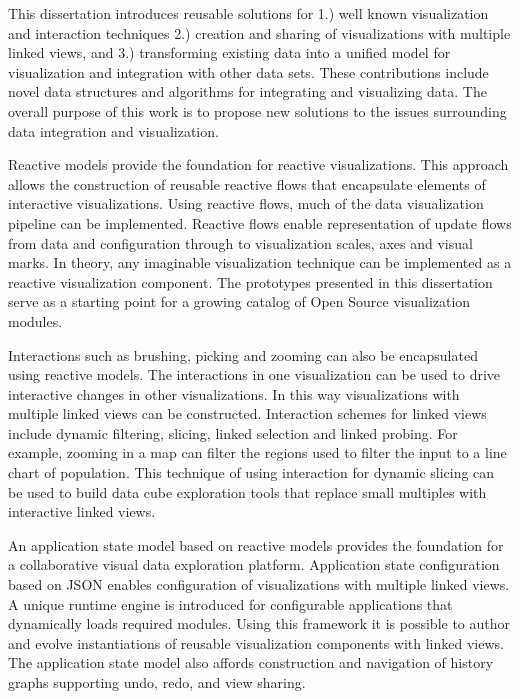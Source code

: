 This dissertation introduces reusable solutions for 1.) well known visualization and interaction techniques 2.) creation and sharing of visualizations with multiple linked views, and 3.) transforming existing data into a unified model for visualization and integration with other data sets. These contributions include novel data structures and algorithms for integrating and visualizing data. The overall purpose of this work is to propose new solutions to the issues surrounding data integration and visualization.

Reactive models provide the foundation for reactive visualizations. This approach allows the construction of reusable reactive flows that encapsulate elements of interactive visualizations. Using reactive flows, much of the data visualization pipeline can be implemented. Reactive flows enable representation of update flows from data and configuration through to visualization scales, axes and visual marks. In theory, any imaginable visualization technique can be implemented as a reactive visualization component. The prototypes presented in this dissertation serve as a starting point for a growing catalog of Open Source visualization modules.

Interactions such as brushing, picking and zooming can also be encapsulated using reactive models. The interactions in one visualization can be used to drive interactive changes in other visualizations. In this way visualizations with multiple linked views can be constructed. Interaction schemes for linked views include dynamic filtering, slicing, linked selection and linked probing. For example, zooming in a map can filter the regions used to filter the input to a line chart of population. This technique of using interaction for dynamic slicing can be used to build data cube exploration tools that replace small multiples with interactive linked views.

An application state model based on reactive models provides the foundation for a collaborative visual data exploration platform. Application state configuration based on JSON enables configuration of visualizations with multiple linked views. A unique runtime engine is introduced for configurable applications that dynamically loads required modules. Using this framework it is possible to author and evolve instantiations of reusable visualization components with linked views. The application state model also affords construction and navigation of history graphs supporting undo, redo, and view sharing.

